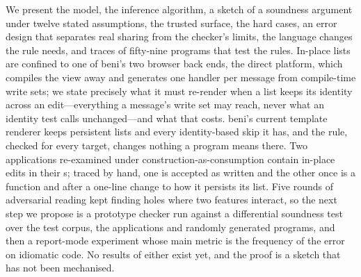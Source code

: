 We present the model, the inference algorithm, a sketch of a soundness argument under twelve stated
assumptions, the trusted surface, the hard cases, an error design that separates real sharing from the
checker's limits, the language changes the rule needs, and traces of fifty-nine programs that test the
rules. In-place lists are confined to one of beni's two browser back ends, the direct platform, which
compiles the view away and generates one handler per message from compile-time write sets; we state
precisely what it must re-render when a list keeps its identity across an edit---everything a message's
write set may reach, never what an identity test calls unchanged---and what that costs. beni's current
template renderer keeps persistent lists and every identity-based skip it has, and the rule, checked for
every target, changes nothing a program means there. Two applications re-examined under
construction-as-consumption contain in-place edits in their s; traced by hand, one is accepted
as written and the other once  is a function and after a one-line change to how it persists its
list. Five rounds of adversarial reading kept finding holes where two features interact, so the next step we
propose is a prototype checker run against a differential soundness test over the test corpus, the
applications and randomly generated programs, and then a report-mode experiment whose main metric is the
frequency of the error on idiomatic
code. No results of either exist yet, and the proof is a sketch that has not been mechanised.

